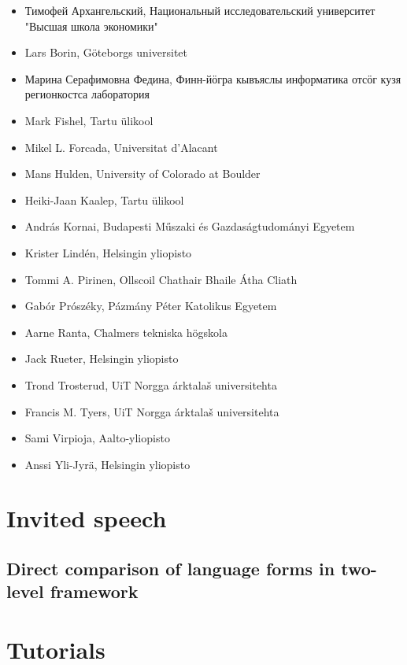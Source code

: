 \documentclass[b5paper]{book}
\begin{document}
\begin{itemize}
    \item Тимофей Архангельский, Национальный исследовательский университет "Высшая школа экономики"
    \item Lars Borin, Göteborgs universitet
    \item Марина Серафимовна Федина, Финн-йӧгра кывъяслы информатика отсӧг кузя регионкостса лаборатория
    \item Mark Fishel, Tartu ülikool
    \item Mikel L. Forcada, Universitat d'Alacant
    \item Mans Hulden, University of Colorado at Boulder
    \item Heiki-Jaan Kaalep, Tartu ülikool
    \item András Kornai, Budapesti Műszaki és Gazdaságtudományi Egyetem
    \item Krister Lindén, Helsingin yliopisto
    \item Tommi A. Pirinen, Ollscoil Chathair Bhaile Átha Cliath
    \item Gabór Prószéky, Pázmány Péter Katolikus Egyetem
    \item Aarne Ranta, Chalmers tekniska högskola
    \item Jack Rueter, Helsingin yliopisto
    \item Trond Trosterud, UiT Norgga árktalaš universitehta
    \item Francis M. Tyers, UiT Norgga árktalaš universitehta
    \item Sami Virpioja, Aalto-yliopisto
    \item Anssi Yli-Jyrä, Helsingin yliopisto
\end{itemize}

\tableofcontents

\mainmatter

\chapter{Invited speech}
\section{Direct comparison of language forms in two-level framework}



\chapter{Tutorials}
\end{document}
